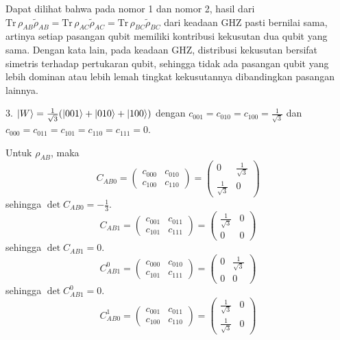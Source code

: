 \par
Dapat dilihat bahwa pada nomor 1 dan nomor 2, hasil dari $\mathrm{Tr}\,\rho_{AB}\tilde{\rho}_{AB}=\mathrm{Tr}\,\rho_{AC}\tilde{\rho}_{AC}=\mathrm{Tr}\,\rho_{BC}\tilde{\rho}_{BC}$ dari keadaan GHZ pasti bernilai sama, artinya setiap pasangan qubit memiliki kontribusi kekusutan dua qubit yang sama. Dengan kata lain, pada keadaan GHZ, distribusi kekusutan bersifat simetris terhadap pertukaran qubit, sehingga tidak ada pasangan qubit yang lebih dominan atau lebih lemah tingkat kekusutannya dibandingkan pasangan lainnya.

3. { $\ket{W}=\frac{1}{\sqrt{3}}(\ket{001}+\ket{010}+\ket{100})$}
dengan $c_{001}=c_{010}=c_{100}=\frac{1}{\sqrt{3}}$ dan $c_{000}=c_{011}=c_{101}=c_{110}=c_{111}=0$.

Untuk $\rho_{AB}$, maka
\begin{equation}
	C_{AB0}=
	\begin{pmatrix}
		c_{000} & c_{010} \\
		c_{100} & c_{110}
	\end{pmatrix}=
	\begin{pmatrix}
		0 & \frac{1}{\sqrt{3}} \\
		\frac{1}{\sqrt{3}} & 0
	\end{pmatrix}
\end{equation}
sehingga $\det C_{AB0} = -\frac{1}{3}$.
\begin{equation}
	C_{AB1}=
	\begin{pmatrix}
		c_{001} & c_{011} \\
		c_{101} & c_{111}
	\end{pmatrix}=
	\begin{pmatrix}
		\frac{1}{\sqrt{3}} & 0 \\
		0 & 0
	\end{pmatrix}
\end{equation}
sehingga $\det C_{AB1} = 0$.
\begin{equation}
	C_{AB1}^0=
	\begin{pmatrix}
		c_{000} & c_{010} \\
		c_{101} & c_{111}
	\end{pmatrix}=
	\begin{pmatrix}
		0 & \frac{1}{\sqrt{3}} \\
		0 & 0
	\end{pmatrix}
\end{equation}
sehingga $\det C_{AB1}^0 = 0$.
\begin{equation}
	C_{AB0}^1=
	\begin{pmatrix}
		c_{001} & c_{011} \\
		c_{100} & c_{110}
	\end{pmatrix}=
	\begin{pmatrix}
		\frac{1}{\sqrt{3}} & 0 \\
		\frac{1}{\sqrt{3}} & 0
	\end{pmatrix}
\end{equation}
